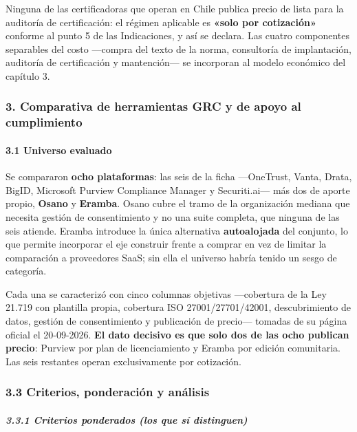 Ninguna de las certificadoras que operan en Chile publica precio de lista para la auditoría de certificación: el régimen aplicable es \textbf{«solo por cotización»} conforme al punto 5 de las Indicaciones, y así se declara. Las cuatro componentes separables del costo ---compra del texto de la norma, consultoría de implantación, auditoría de certificación y mantención--- se incorporan al modelo económico del capítulo 3.

\subsubsection{3. Comparativa de herramientas GRC y de apoyo al cumplimiento}\label{comparativa-de-herramientas-grc-y-de-apoyo-al-cumplimiento}

\paragraph{3.1 Universo evaluado}\label{universo-evaluado}

Se compararon \textbf{ocho plataformas}: las seis de la ficha ---OneTrust, Vanta, Drata, BigID, Microsoft Purview Compliance Manager y Securiti.ai--- más dos de aporte propio, \textbf{Osano} y \textbf{Eramba}. Osano cubre el tramo de la organización mediana que necesita gestión de consentimiento y no una suite completa, que ninguna de las seis atiende. Eramba introduce la única alternativa \textbf{autoalojada} del conjunto, lo que permite incorporar el eje construir frente a comprar en vez de limitar la comparación a proveedores SaaS; sin ella el universo habría tenido un sesgo de categoría.

Cada una se caracterizó con cinco columnas objetivas ---cobertura de la Ley 21.719 con plantilla propia, cobertura ISO 27001/27701/42001, descubrimiento de datos, gestión de consentimiento y publicación de precio--- tomadas de su página oficial el 20-09-2026. \textbf{El dato decisivo es que solo dos de las ocho publican precio}: Purview por plan de licenciamiento y Eramba por edición comunitaria. Las seis restantes operan exclusivamente por cotización.

\subsubsection{3.3 Criterios, ponderación y análisis}\label{criterios-ponderaciuxf3n-y-anuxe1lisis}

\subparagraph{3.3.1 Criterios ponderados (los que sí distinguen)}\label{criterios-ponderados-los-que-suxed-distinguen}

